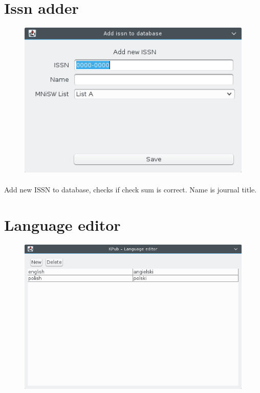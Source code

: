 \documentclass[a4paper,10pt]{article}
\begin{document}
\section{Issn adder}
\begin{figure}[H]
 \centering
 \includegraphics[width=35em]{kpub-issn-add.png}
\end{figure}
\paragraph{}Add new ISSN to database, checks if check sum is correct. Name is journal title.

\section{Language editor}
\begin{figure}[H]
 \centering
 \includegraphics[width=35em]{kpub-lang.png}
\end{figure}
\end{document}
